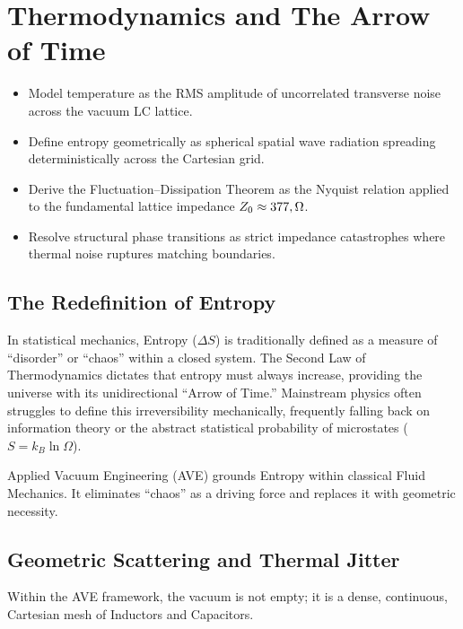\chapter{Thermodynamics and The Arrow of Time}
\label{ch:thermodynamics}


\begin{objectivebox}
\begin{itemize}
    \item Model temperature as the RMS amplitude of uncorrelated transverse noise across the vacuum LC lattice.
    \item Define entropy geometrically as spherical spatial wave radiation spreading deterministically across the Cartesian grid.
    \item Derive the Fluctuation--Dissipation Theorem as the Nyquist relation applied to the fundamental lattice impedance $Z_0 \approx 377\\,\Omega$.
    \item Resolve structural phase transitions as strict impedance catastrophes where thermal noise ruptures matching boundaries.
\end{itemize}
\end{objectivebox}

\section{The Redefinition of Entropy}
In statistical mechanics, Entropy ($\Delta S$) is traditionally defined as a measure of ``disorder'' or ``chaos'' within a closed system. The Second Law of Thermodynamics dictates that entropy must always increase, providing the universe with its unidirectional ``Arrow of Time.'' Mainstream physics often struggles to define this irreversibility mechanically, frequently falling back on information theory or the abstract statistical probability of microstates ($S = k_B \ln \Omega$).

Applied Vacuum Engineering (AVE) grounds Entropy within classical Fluid Mechanics. It eliminates ``chaos'' as a driving force and replaces it with geometric necessity.

\section{Geometric Scattering and Thermal Jitter}
Within the AVE framework, the vacuum is not empty; it is a dense, continuous, Cartesian mesh of Inductors and Capacitors. 

